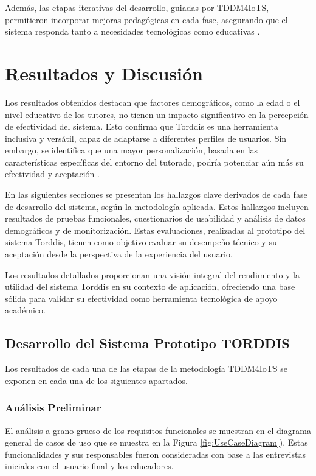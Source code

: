 \documentclass[a4paper,fleqn]{cas-sc}
\begin{document}
			Además, las etapas iterativas del desarrollo, guiadas por TDDM4IoTS, permitieron incorporar mejoras pedagógicas en cada fase, asegurando que el sistema responda tanto a necesidades tecnológicas como educativas \citep{Huang2025How}.
			
	\section{Resultados y Discusión}
	\label{seccion:Cinco}
		Los resultados obtenidos destacan que factores demográficos, como la edad o el nivel educativo de los tutores, no tienen un impacto significativo en la percepción de efectividad del sistema. Esto confirma que Torddis es una herramienta inclusiva y versátil, capaz de adaptarse a diferentes perfiles de usuarios. Sin embargo, se identifica que una mayor personalización, basada en las características específicas del entorno del tutorado, podría potenciar aún más su efectividad y aceptación \citep{Conati2021Toward}.
		
		En las siguientes secciones se presentan los hallazgos clave derivados de cada fase de desarrollo del sistema, según la metodología aplicada. Estos hallazgos incluyen resultados de pruebas funcionales, cuestionarios de usabilidad y análisis de datos demográficos y de monitorización. Estas evaluaciones, realizadas al prototipo del sistema Torddis, tienen como objetivo evaluar su desempeño técnico y su aceptación desde la perspectiva de la experiencia del usuario.
		
		Los resultados detallados proporcionan una visión integral del rendimiento y la utilidad del sistema Torddis en su contexto de aplicación, ofreciendo una base sólida para validar su efectividad como herramienta tecnológica de apoyo académico.

		\subsection{Desarrollo del Sistema Prototipo TORDDIS}
			Los resultados de cada una de las etapas de la metodología TDDM4IoTS \citep{Guerrero-Ulloa2020TDDM4IoTS} se exponen en cada una de los siguientes apartados.
			
			\subsubsection{Análisis Preliminar}
				El análisis a grano grueso de los requisitos funcionales se muestran en el diagrama general de casos de uso que se muestra en la Figura \ref{fig:UseCaseDiagram}). Estas funcionalidades y sus responsables fueron consideradas con base a las entrevistas iniciales con el usuario final y los educadores.
				
\end{document}
